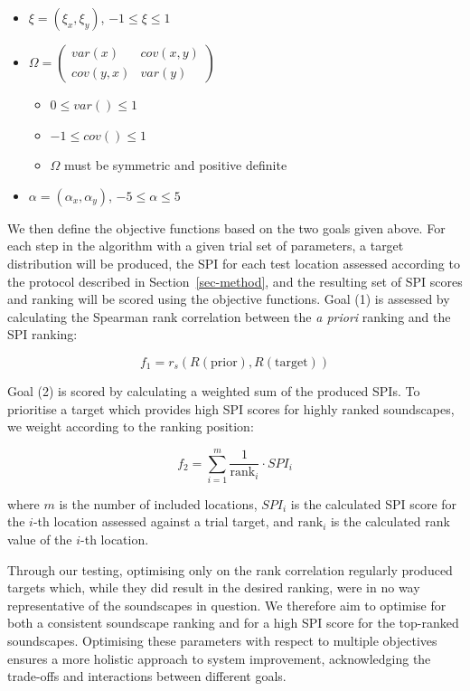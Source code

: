 \documentclass[
  authoryear,
  preprint,
  1p]{elsarticle}
\providecommand{\tightlist}{%
  \setlength{\itemsep}{0pt}\setlength{\parskip}{0pt}}\usepackage{longtable,booktabs,array}
\begin{document}
\begin{itemize}
\tightlist
\item
  \(\xi = (\xi_x, \xi_y)\), \(-1 \leq \xi \leq 1\)
\item
  \(\Omega = \begin{pmatrix} var(x) & cov(x, y) \\ cov(y, x) & var(y) \end{pmatrix}\)

  \begin{itemize}
  \tightlist
  \item
    \(0 \leq var() \leq 1\)
  \item
    \(-1 \leq cov() \leq 1\)
  \item
    \(\Omega\) must be symmetric and positive definite
  \end{itemize}
\item
  \(\alpha = (\alpha_x, \alpha_y)\), \(-5 \leq \alpha \leq 5\)
\end{itemize}

We then define the objective functions based on the two goals given
above. For each step in the algorithm with a given trial set of
parameters, a target distribution will be produced, the SPI for each
test location assessed according to the protocol described in
Section~\ref{sec-method}, and the resulting set of SPI scores and
ranking will be scored using the objective functions. Goal (1) is
assessed by calculating the Spearman rank correlation between the
\emph{a priori} ranking and the SPI ranking:

\[
f_1 = r_{s}(R(\text{prior}), R(\text{target}))
\]

Goal (2) is scored by calculating a weighted sum of the produced SPIs.
To prioritise a target which provides high SPI scores for highly ranked
soundscapes, we weight according to the ranking position:

\[
f_2 = \sum_{i=1}^m \frac{1}{\text{rank}_i} \cdot SPI_i
\]

where \(m\) is the number of included locations, \(SPI_i\) is the
calculated SPI score for the \(i\)-th location assessed against a trial
target, and \(\text{rank}_i\) is the calculated rank value of the
\(i\)-th location.

Through our testing, optimising only on the rank correlation regularly
produced targets which, while they did result in the desired ranking,
were in no way representative of the soundscapes in question. We
therefore aim to optimise for both a consistent soundscape ranking and
for a high SPI score for the top-ranked soundscapes. Optimising these
parameters with respect to multiple objectives ensures a more holistic
approach to system improvement, acknowledging the trade-offs and
interactions between different goals.
\end{document}
